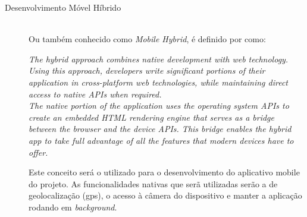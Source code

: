 \begin{description}
%
    \item[Desenvolvimento Móvel Híbrido] \hfill \\
        Ou também conhecido como \textit{Mobile Hybrid}, é definido por  como:
        \begin{citacao}
            \textit{The hybrid approach combines native development with web technology. Using this approach, developers write significant portions of their application in cross-platform web technologies, while maintaining direct access to native APIs when required.}\\
        \textit{The native portion of the application uses the operating system APIs to create an embedded HTML rendering engine that serves as a bridge between the browser and the device APIs. This bridge enables the hybrid app to take full advantage of all the features that modern devices have to offer.}
        \end{citacao}
        Este conceito será o utilizado para o desenvolvimento do aplicativo mobile do projeto. As funcionalidades nativas que serã utilizadas serão a de geolocalização (gps), o acesso à câmera do dispositivo e manter a aplicação rodando em \textit{background}.
\end{description}